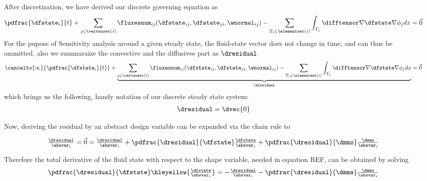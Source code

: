 \documentclass[../main.tex]{subfiles}
\begin{document}
After discretization, we have derived our discrete governing equation as 
\begin{align}\label{eq:nse_final_discretized_2}
\pdfrac{\bar{\dfstate_i}}{t} +
\sum_{j \in \vertexset(i)} \fluxesnum_{ij}(\dfstate_{ij},\dfstate_{ji},\wnormal_{ij}) -
\sum_{T_i \in \elementset(i)} \int_{T_j} \difftensor \nabla \dfstate \nabla \phi_j dx =
\vec{0}
\end{align}
For the pupose of Sensitivity analysis around a given steady state, the fluid-state vector does not change in time, and can thus be ommitted, also we summaraize the convective and the diffusivee part as $\dresidual$ 
\begin{align}\label{eq:nse_final_discretized_notationchange}
\cancelto{\infty}{\pdfrac{\bar{\dfstate_i}}{t}} +
\underbrace{\sum_{j \in \vertexset(i)} \fluxesnum_{ij}(\dfstate_{ij},\dfstate_{ji},\wnormal_{ij}) -
\sum_{T_i \in \elementset(i)} \int_{T_j} \difftensor \nabla \dfstate \nabla \phi_j dx}_{\dresidual} =
\vec{0}
\end{align}
which brings us the following, handy notation of our discrete steady state system:
\begin{align}\label{eq:discrete_steady_state}
\dresidual=\dvec{0}
\end{align}



Now, deriving the residual by an abstract design variable can be expanded via the chain rule to

\def\DdresidualBYabsvarI{ \tfrac{\dresidual}{\absvar_i} }
\def\PdresidualBYabsvarI{ \pdfrac{\dresidual}{\absvar_i} }
\def\PdresidualBYdfstate{ \pdfrac{\dresidual}{\dfstate}  }
\def\DdfstateBYabsvarI  { \tfrac{\dfstate}{\absvar_i}   }
\def\PdresidualBYdmms   { \pdfrac{\dresidual}{\dmms}     }
\def\DdmmsBYabsvarI     { \tfrac{\dmms}{\absvar_i}      }
\begin{align}
\DdresidualBYabsvarI=\vec{0}=
\DdresidualBYabsvarI                      +
\PdresidualBYdfstate    \DdfstateBYabsvarI +
\PdresidualBYdmms       \DdmmsBYabsvarI
\end{align}



Therefore the total derivative of the fluid state with respect to the shape variable, needed in equation REF, can be obtained by solving
\begin{align}\label{eq:dfstate_by_absvarI}
\PdresidualBYdfstate    \hleyellow{\DdfstateBYabsvarI}=
-\DdresidualBYabsvarI 
-\PdresidualBYdmms       \DdmmsBYabsvarI
\end{align}
\end{document}
